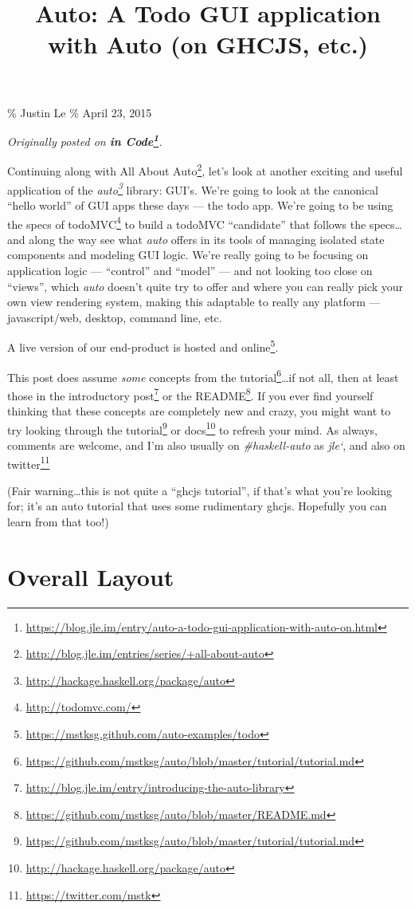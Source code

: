 \documentclass[]{article}
\title{Auto: A Todo GUI application with Auto (on GHCJS, etc.)}
\renewcommand{\href}[2]{#2\footnote{\url{#1}}}
\begin{document}
\maketitle

\% Justin Le \% April 23, 2015

\emph{Originally posted on
\textbf{\href{https://blog.jle.im/entry/auto-a-todo-gui-application-with-auto-on.html}{in
Code}}.}

Continuing along with
\href{http://blog.jle.im/entries/series/+all-about-auto}{All About Auto}, let's
look at another exciting and useful application of the
\emph{\href{http://hackage.haskell.org/package/auto}{auto}} library: GUI's.
We're going to look at the canonical ``hello world'' of GUI apps these days ---
the todo app. We're going to be using the specs of
\href{http://todomvc.com/}{todoMVC} to build a todoMVC ``candidate'' that
follows the specs\ldots and along the way see what \emph{auto} offers in its
tools of managing isolated state components and modeling GUI logic. We're really
going to be focusing on application logic --- ``control'' and ``model'' --- and
not looking too close on ``views'', which \emph{auto} doesn't quite try to offer
and where you can really pick your own view rendering system, making this
adaptable to really any platform --- javascript/web, desktop, command line, etc.

A live version of our end-product
\href{https://mstksg.github.com/auto-examples/todo}{is hosted and online}.

This post does assume \emph{some} concepts from the
\href{https://github.com/mstksg/auto/blob/master/tutorial/tutorial.md}{tutorial}\ldots if
not all, then at least those in the
\href{http://blog.jle.im/entry/introducing-the-auto-library}{introductory post}
or the \href{https://github.com/mstksg/auto/blob/master/README.md}{README}. If
you ever find yourself thinking that these concepts are completely new and
crazy, you might want to try looking through the
\href{https://github.com/mstksg/auto/blob/master/tutorial/tutorial.md}{tutorial}
or \href{http://hackage.haskell.org/package/auto}{docs} to refresh your mind. As
always, comments are welcome, and I'm also usually on \emph{\#haskell-auto} as
\emph{jle`}, and also on \href{https://twitter.com/mstk}{twitter}

(Fair warning\ldots this is not quite a ``ghcjs tutorial'', if that's what
you're looking for; it's an auto tutorial that uses some rudimentary ghcjs.
Hopefully you can learn from that too!)

\section{Overall Layout}\label{overall-layout}
\end{document}
